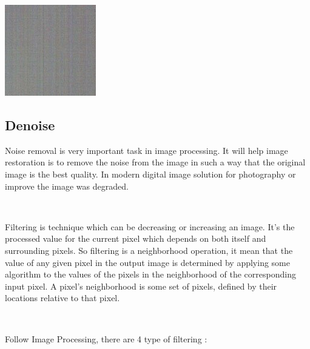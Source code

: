 \begin{itemize}
\begin{center}
	\includegraphics{banding.png}
\end{center}

\end{itemize}

\subsection{Denoise}

Noise removal is very important task in image processing. It will help image restoration is to remove the
noise from the image in such a way that the original image is the best quality. In modern digital image
solution for photography or improve the image was degraded.

\

Filtering is technique which can be decreasing or increasing an image. It’s the processed value for the
current pixel which depends on both itself and surrounding pixels. So filtering is a neighborhood operation,
it mean that the value of any given pixel in the output image is determined by applying some algorithm to the values of the pixels in the neighborhood of the corresponding input pixel. A pixel’s neighborhood is
some set of pixels, defined by their locations relative to that pixel.

\

Follow Image Processing, there are 4 type of filtering :

